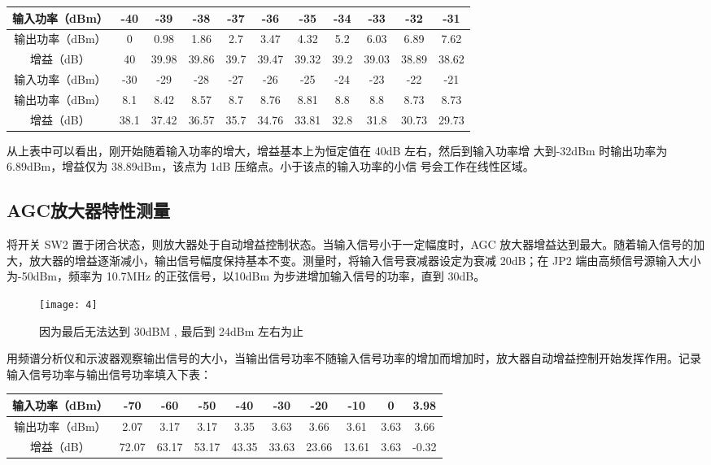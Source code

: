 \documentclass{../source/Experiment}
\begin{document}
\begin{table}[H]
    \begin{tabular}{|c|c|c|c|c|c|c|c|c|c|c|}
        \hline
        输入功率（dBm） & -40  & -39   & -38   & -37  & -36   & -35   & -34  & -33   & -32   & -31   \\ \hline
        输出功率（dBm） & 0    & 0.98  & 1.86  & 2.7  & 3.47  & 4.32  & 5.2  & 6.03  & 6.89  & 7.62  \\ \hline
        增益（dB）      & 40   & 39.98 & 39.86 & 39.7 & 39.47 & 39.32 & 39.2 & 39.03 & 38.89 & 38.62 \\ \hline
        输入功率（dBm） & -30  & -29   & -28   & -27  & -26   & -25   & -24  & -23   & -22   & -21   \\ \hline
        输出功率（dBm） & 8.1  & 8.42  & 8.57  & 8.7  & 8.76  & 8.81  & 8.8  & 8.8   & 8.73  & 8.73  \\ \hline
        增益（dB）      & 38.1 & 37.42 & 36.57 & 35.7 & 34.76 & 33.81 & 32.8 & 31.8  & 30.73 & 29.73 \\ \hline
    \end{tabular}
\end{table}

从上表中可以看出，刚开始随着输入功率的增大，增益基本上为恒定值在 40dB 左右，然后到输入功率增
大到-32dBm 时输出功率为 6.89dBm，增益仅为 38.89dBm，该点为 1dB 压缩点。小于该点的输入功率的小信
号会工作在线性区域。

\subsection{AGC放大器特性测量}

将开关 SW2 置于闭合状态，则放大器处于自动增益控制状态。当输入信号小于一定幅度时，AGC 放大器增益达到最大。随着输入信号的加大，放大器的增益逐渐减小，输出信号幅度保持基本不变。测量时，将输入信号衰减器设定为衰减 20dB；在 JP2 端由高频信号源输入大小为-50dBm，频率为 10.7MHz 的正弦信号，以10dBm 为步进增加输入信号的功率，直到 30dB。

\begin{figure}[H]
    \centering
    \texttt{[image: 4]}
    \caption{因为最后无法达到 30dBM , 最后到 24dBm 左右为止}
\end{figure}

用频谱分析仪和示波器观察输出信号的大小，当输出信号功率不随输入信号功率的增加而增加时，放大器自动增益控制开始发挥作用。记录输入信号功率与输出信号功率填入下表：

\begin{table}[H]
    \begin{tabular}{|c|c|c|c|c|c|c|c|c|c|}
        \hline
        输入功率（dBm） & -70   & -60   & -50   & -40   & -30   & -20   & -10   & 0    & 3.98  \\ \hline
        输出功率（dBm） & 2.07  & 3.17  & 3.17  & 3.35  & 3.63  & 3.66  & 3.61  & 3.63 & 3.66  \\ \hline
        增益（dB）      & 72.07 & 63.17 & 53.17 & 43.35 & 33.63 & 23.66 & 13.61 & 3.63 & -0.32 \\ \hline
    \end{tabular}
\end{table}
\end{document}
